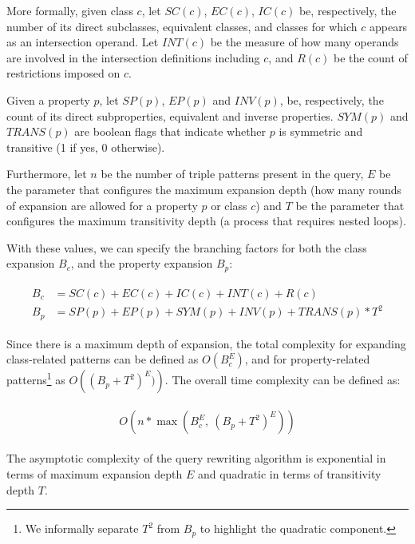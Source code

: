 More formally, given class $c$, let $SC(c)$, $EC(c)$, $IC(c)$ be, respectively, the number of its direct subclasses, equivalent classes, and classes for which $c$ appears as an intersection operand. Let $INT(c)$ be the measure of how many operands are involved in the intersection definitions including $c$, and $R(c)$ be the count of restrictions imposed on $c$. 

Given a property $p$, let $SP(p)$, $EP(p)$ and $INV(p)$, be, respectively, the count of its direct subproperties, equivalent and inverse properties. $SYM(p)$ and $TRANS(p)$ are boolean flags that indicate whether $p$ is symmetric and transitive (1 if yes, 0 otherwise).

Furthermore, let $n$ be the number of triple patterns present in the query, $E$ be the parameter that configures the maximum expansion depth (how many rounds of expansion are allowed for a property $p$ or class $c$) and $T$ be the parameter that configures the maximum transitivity depth (a process that requires nested loops).  

With these values, we can specify the branching factors for both the class expansion $B_c$, and the property expansion $B_p$:

\begin{align}
    \label{equation:branching-factors}
    \begin{split}
        B_c &= SC(c) + EC(c) + IC(c) + INT(c) + R(c) \\
        B_p &= SP(p) + EP(p) + SYM(p) + INV(p) + TRANS(p) * T^2 
    \end{split}
\end{align}

Since there is a maximum depth of expansion, the total complexity for expanding class-related patterns can be defined as $O\left( B_c^E \right)$, and for property-related patterns\footnote{We informally separate $T^2$ from $B_p$ to highlight the quadratic component.} as $O \left( (B_p + T^2)^E) \right)$. The overall time complexity can be defined as:

\begin{align}
    \label{equation:query-rewriting-complexity}
    \begin{split}
        O\left( n * \max \left( B_c^E,\ (B_p + T^2)^E \right) \right) 
    \end{split}
\end{align}


The asymptotic complexity of the query rewriting algorithm is exponential in terms of maximum expansion depth $E$ and quadratic in terms of transitivity depth $T$.

